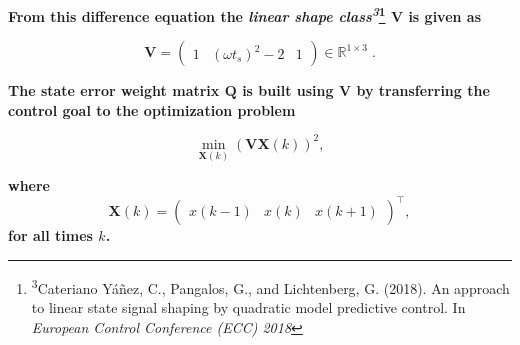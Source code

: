 \documentclass[a0paper,portrait]{baposter}
\begin{document}
\begin{poster}
{\textbf{From this difference equation the \textit{linear shape class\textsuperscript{3}}{\renewcommand*\@makefnmark{}\footnote{\textsuperscript{3}Cateriano Y\'a\~nez, C., Pangalos, G., and Lichtenberg, G. (2018). An approach to linear state signal shaping by quadratic model predictive control. In \textit{European Control Conference (ECC) 2018 \vspace{-.4em}}}\makeatother} $\mathbf{V}$ is given as}

\vspace{-.3em}
\begin{equation*}
\mathbf{V} = 
\left( \begin{array}{ccc} 
1 & (\omega t_s)^2 -2 & 1
\end{array} \right)\in \mathbb{R}^{1 \times 3} \; .
\end{equation*}

\textbf{The state error weight matrix $\mathbf{Q}$ is built using $\mathbf{V}$ by transferring the control goal to the optimization problem}

\vspace{-.3em}
\begin{equation*}
\min_{\mathbf{X}(k)} \left( \mathbf{V}\mathbf{X}(k) \right)^2,
\end{equation*}

\vspace{-.7em}
\textbf{where}
\small
\begin{equation*} 
\mathbf{X}(k) =  \left(\begin{array}{ccc} x(k-1) & x(k) & x(k+1) \end{array} \right)^\intercal\!,
\end{equation*}
\normalsize
\textbf{for all times $k$.}

\vspace{.56em}
}



\end{poster}
\end{document}
